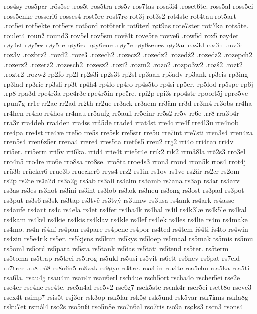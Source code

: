 {{ros4sy
ros5per
.rös5se
.ros5t
ros5tra
røs5v
ros7tas
rosa3i4
.roset6te.
ross5al
ross5ei
ross5enke
rosseri6
rosses4
rost5re
rost7rø
rot3j
rot3s2
rot4ste
rot4tau
rot5art
.rot5ei
rot5ekte
rot5ers
rot5ord
rot6terk
rot6terl
røt9as
rote7ster
roti7ka
rots5te.
roulet4
roun2
round3
rov5el
rov5sm
rově4t
rove5re
rovve6
.row5d
rox5
røy4et
røy4st
røy5es
røy5re
røy6ed
røy6ene
.røy7e
røy8senes
røy9ar
roz3d
roz3n
.roz3r
roz3v
.rozbrz2
.rozd2
.roze3
.rozech2
.rozecz2
.rozedz2
.rozedź2
.rozedż2
.rozepch2
.rozerz2
.rozerż2
.rozesch2
.rozesz2
.rozi2
.rozm2
.rozo2
.rozpo3w2
.rozś2
.rozt2
.roztr2
.rozw2
rp2fo
rp2l
rp2s3i
rp2s3t
rp2sl
rp3aan
rp3adv
rp3ank
rp3eis
rp3ing
rp3lad
rp3ric
rp3sli
rp3t
rp4h4
rp4lo
rp4ro
rp4s5to
rp4si
rp5er.
rp5lod
rp5spe
rp6j
.rp8
rpa3d
rpe4r3a
rpe4r3e
rpe4r5in
rpe5re.
rpi2p
rpi3s
rpo4str
rpoort5j
rprø5ve
rpun7g
rr1c
rr2ac
rr2ad
rr2th
rr2ue
rr3ack
rr3aem
rr3äm
rr3d
rr3m4
rr3obs
rr4ha
rr4hen
rr4ho
rr4hos
rr4nau
rr5aufg
rr5aufl
rr5einr
rr5s2
rr5v
rr6e
.rr8
rra3b4r
rra3r
rra4deb
rra4den
rra4ss
rrå5de
rrade4
rrat4st
rre4c
rre4f
rre4l3u
rre4nob
rre4pa
rre4st
rre4ve
rre5o
rre5s
rre5sk
rre5str
rre5u
rre7int
rre7sti
rren3s4
rren4za
rren5s4
rren6z5er
rrena4
rrere4
rres5ta
rret6s5
rreu2
rrg2
rri4o
rri4tan
rri4v
rri5er.
rri5erm
rri5v
rri6ka.
rrid4
rrie4t
rrie5r4e
rrik2
rrk2
rrmå8la
rrö2s3
rro3el
rro4n5
rro4re
rro6e
rro8sa
rro8se.
rro8ta
rroe4s3
rron3
rron4
rron5k
rros4
rrot4j
rrü3b
rrücker6
rrue3b
rruecker6
rrys4
rrz2
rs1in
rs1ov
rs1ve
rs2är
rs2cr
rs2om
rs2p
rs2te
rs3a2d
rs3a2g
rs3ab
rs3all
rs3alm
rs3amb
rs3ana
rs3ap
rs3ar
rs3arv
rs3as
rs3es
rs3hot
rs3ini
rs3int
rs3lob
rs3lok
rs3neu
rs3ong
rs3ost
rs3pad
rs3pot
rs3put
rs3s6
rs3sk
rs3tap
rs3tvě
rs3tvý
rs3umw
rs3usa
rs4ank
rs4ark
rs4asse
rs4aufe
rs4aut
rs4c
rs4ela
rs4et
rs4fer
rs4ha4k
rs4hal
rs4il
rs4k3læ
rs4k5le
rs4kal
rs4kam
rs4kel
rs4kie
rs4kis
rs4klav
rs4kle
rs4lef
rs4lek
rs4les
rs4lie
rs4m
rs4make
rs4mo.
rs4n
rš4ní
rs4pan
rs4pare
rs4pene
rs4por
rs4ted
rs4tem
řš4ti
řs4to
rs4win
rs4zin
rs5e4rik
rs5er.
rs5kjens
rs5kun
rs5kys
rs5loep
rs5maal
rs5mak
rs5mis
rs5mu
rs5oml
rs5ord
rs5para
rs5sta
rs5tank
rs5tas
rs5täti
rs5tend
rs5ter.
rs5term
rs5toma
rs5trap
rs5trei
rs5trog
rs5ukl
rs5usi
rs5vit
rs6ett
rs6nev
rs6pat
rs7eld
rs7tree
.rs8
.rś8
rs8o6n5
rs8vak
rs9øye
rs9tre.
rsa4lin
rsa4te
rsa5chu
rsa5ka
rsa5ti
rsa6la.
rsau4g
rsau4m
rsau4r
rsau6erl
rsch4ue
rsch5ort
rscha4o
rscher5ei
rse2e
rse4cr
rse4ne
rse4te.
rse5n4al
rse5v2
rse6g7
rsek5ste
rsenk4r
rser5ei
rsett8o
rseve3
rsex4t
rsimp7
rsis5t
rsj3or
rsk3op
rsk5lar
rsk5ø
rsk5und
rsk5var
rsk7inns
rskla8g
rsku7et
rsmål4
rso2s
rso5n6i
rso5n8e
rso7n6al
rso7ris
rso9a
rsøks3
rson3
rsons4
}}

